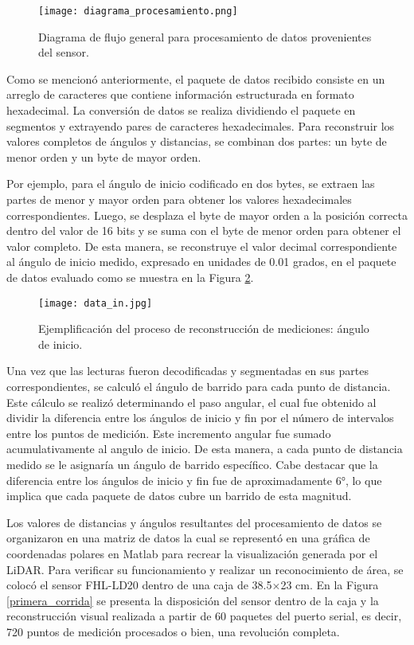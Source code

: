 \begin{figure}[H]
	\centering
	\texttt{[image: diagrama\_procesamiento.png]}
	\caption{Diagrama de flujo general para procesamiento de datos provenientes del sensor.}
	\label{fig:diagrama_procesamiento}
\end{figure}

Como se mencionó anteriormente, el paquete de datos recibido consiste en un arreglo de caracteres que contiene información estructurada en formato hexadecimal. La conversión de datos se realiza dividiendo el paquete en segmentos y extrayendo pares de caracteres hexadecimales. Para reconstruir los valores completos de ángulos y distancias, se combinan dos partes: un byte de menor orden y un byte de mayor orden. 

Por ejemplo, para el ángulo de inicio codificado en dos bytes, se extraen las partes de menor y mayor orden para obtener los valores hexadecimales correspondientes. Luego, se desplaza el byte de mayor orden a la posición correcta dentro del valor de 16 bits y se suma con el byte de menor orden para obtener el valor completo. De esta manera, se reconstruye el valor decimal correspondiente al ángulo de inicio medido, expresado en unidades de 0.01 grados, en el paquete de datos evaluado como se muestra en la Figura \ref{fig:data_in}.

\begin{figure}[H]
	\centering
	\texttt{[image: data\_in.jpg]}
	\caption{Ejemplificación del proceso de reconstrucción de mediciones: ángulo de inicio.}
	\label{fig:data_in}
\end{figure}

Una vez que las lecturas fueron decodificadas y segmentadas en sus partes correspondientes, se calculó el ángulo de barrido para cada punto de distancia. Este cálculo se realizó determinando el paso angular, el cual fue obtenido al dividir la diferencia entre los ángulos de inicio y fin por el número de intervalos entre los puntos de medición. Este incremento angular fue sumado acumulativamente al angulo de inicio. De esta manera, a cada punto de distancia medido se le asignaría un ángulo de barrido específico. Cabe destacar que la diferencia entre los ángulos de inicio y fin fue de aproximadamente 6°, lo que implica que cada paquete de datos cubre un barrido de esta magnitud.

Los valores de distancias y ángulos resultantes del procesamiento de datos se organizaron en una matriz de datos la cual se representó en una gráfica de coordenadas polares en Matlab para recrear la visualización generada por el LiDAR. Para verificar su funcionamiento y realizar un reconocimiento de área, se colocó el sensor FHL-LD20 dentro de una caja de 38.5$\times$23 cm. En la Figura \ref{primera_corrida} se presenta la disposición del sensor dentro de la caja y la reconstrucción visual realizada a partir de 60 paquetes del puerto serial, es decir, 720 puntos de medición procesados o bien, una revolución completa.

